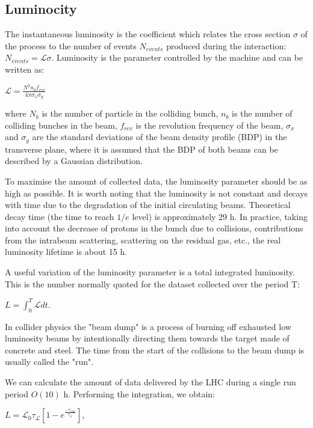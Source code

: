 \begin{normalsize}
\subsection{Luminocity}


The instantaneous luminosity is the coefficient which relates the cross section $\sigma$ of the process to the number of events $N_{events}$ produced during the interaction: $N_{events} = \mathcal{L}  \sigma$. Luminosity is the parameter controlled by the machine and can be written as:

$ \mathcal{L} =\frac{N^2 n_b f_{rev}}{4\pi \sigma_x \sigma_y}$

\noindent where $N_b$ is the number of particle in the colliding bunch, $n_b$ is the number of colliding bunches in the beam, $f_{rev}$ is the revolution frequency of the beam, $\sigma_x$ and $\sigma_y$ are the standard deviations of the beam density profile (BDP) in the transverse plane, where it is assumed that the BDP of both beams can be described by a Gaussian distribution.


To maximise the amount of collected data, the luminosity parameter should be as high as possible. It is worth noting that the luminosity is not constant and decays with time due to the degradation of the initial circulating beams. Theoretical decay time (the time to reach $1/e$ level) is approximately 29 h. In practice, taking into account the decrease of protons in the bunch due to collisions, contributions from the intrabeam scattering, scattering on the residual gas, etc., the real luminosity lifetime is about 15 h. 

A useful variation of the luminosity parameter is a total integrated luminosity. This is the number normally quoted for the dataset collected over the period T:

$L = \int_{0}^{T} \mathcal{L}  dt$.

In collider physics the "beam dump" is a process of burning off exhausted low luminosity beams by intentionally directing them towards the target made of concrete and steel. The time from the start of the collisions to the beam dump is usually called the "run".

We can calculate the amount of data delivered by the LHC during a single run period $O(10)$ h. Performing the integration, we obtain: 

 $L = \mathcal{L}_0 \tau_\mathcal{L}  \left[  1- e^{\frac{-\tau_{run}}{\tau_\mathcal{L} }}  \right]$, 


\end{normalsize}
